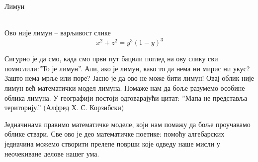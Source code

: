 \documentclass[sr]{./../../common/SurferDesc}%
\begin{document}
\footnotesize

\begin{surferPage}
  \begin{surferTitle} Лимун\end{surferTitle}  \\ %
Ово није лимун – варљивост слике\\
\smallskip
\[x^2 + z^2 = y^3 (1 - y)^3\] 


\singlespacing
Сигурно је да смо, када смо први пут бацили поглед на ову слику сви помислили:''То је лимун''. Али, ако је лимун, како то да нема ни мирис ни укус? Зашто нема мрље или поре? Јасно је да ово не може бити лимун! 
\singlespacing
Овај облик није лимун већ математички модел лимуна. Помаже нам да боље разумемо особине облика лимуна. У географији постоји одговарајући цитат: ''Мапа не представља територију.'' (Алфред Х. С. Корзибски) \\
\singlespacing

Једначинама правимо математичке моделе, који нам помажу да боље проучавамо облике ствари. 
\singlespacing
Све ово је део математичке поетике: помоћу алгебарских једначина можемо створити прелепе површи које одведу наше мисли у неочекиване делове нашег ума. 



  \begin{surferText}
     \end{surferText}
\end{surferPage}
\end{document}
